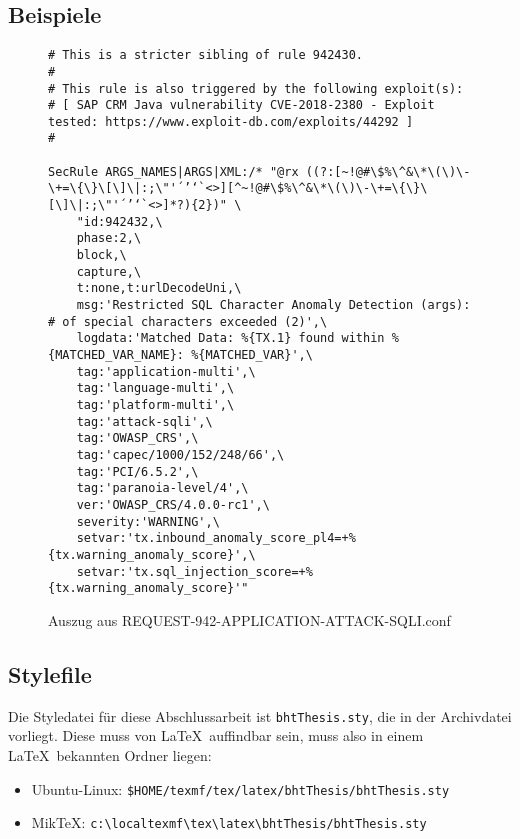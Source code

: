 \subsection*{Beispiele}

      \begin{figure}
        \caption{Auszug aus REQUEST-942-APPLICATION-ATTACK-SQLI.conf}
        \label{fig:saprule}
\begin{lstlisting}
# This is a stricter sibling of rule 942430.
#
# This rule is also triggered by the following exploit(s):
# [ SAP CRM Java vulnerability CVE-2018-2380 - Exploit tested: https://www.exploit-db.com/exploits/44292 ]
#

SecRule ARGS_NAMES|ARGS|XML:/* "@rx ((?:[~!@#\$%\^&\*\(\)\-\+=\{\}\[\]\|:;\"'´’‘`<>][^~!@#\$%\^&\*\(\)\-\+=\{\}\[\]\|:;\"'´’‘`<>]*?){2})" \
    "id:942432,\
    phase:2,\
    block,\
    capture,\
    t:none,t:urlDecodeUni,\
    msg:'Restricted SQL Character Anomaly Detection (args): # of special characters exceeded (2)',\
    logdata:'Matched Data: %{TX.1} found within %{MATCHED_VAR_NAME}: %{MATCHED_VAR}',\
    tag:'application-multi',\
    tag:'language-multi',\
    tag:'platform-multi',\
    tag:'attack-sqli',\
    tag:'OWASP_CRS',\
    tag:'capec/1000/152/248/66',\
    tag:'PCI/6.5.2',\
    tag:'paranoia-level/4',\
    ver:'OWASP_CRS/4.0.0-rc1',\
    severity:'WARNING',\
    setvar:'tx.inbound_anomaly_score_pl4=+%{tx.warning_anomaly_score}',\
    setvar:'tx.sql_injection_score=+%{tx.warning_anomaly_score}'"
\end{lstlisting}
      \end{figure}


\subsection*{Stylefile}
Die  Styledatei für diese  Abschlussarbeit ist  \texttt{bhtThesis.sty}, die  in der
Archivdatei vorliegt.  Diese muss von \LaTeX\  auffindbar sein, muss  also in einem
\LaTeX\ bekannten Ordner liegen:
\begin{itemize}
\item Ubuntu-Linux: \verb|$HOME/texmf/tex/latex/bhtThesis/bhtThesis.sty|
\item MikTeX: \verb|c:\localtexmf\tex\latex\bhtThesis/bhtThesis.sty|
\end{itemize}


